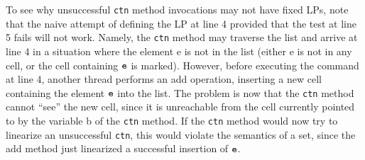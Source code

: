 To see why unsuccessful {\tt ctn} method invocations may not have fixed LPs, note
that the naive attempt of defining the LP at line 4 provided that the test at line 5 fails
will not work. Namely, the {\tt ctn} method may traverse the list and arrive at line 4 in a
situation where the element e is not in the list (either e is not in any cell, or the cell
containing $\tt e$ is marked). However, before executing the command at line 4, another
thread performs an add operation, inserting a new cell containing the element $\tt e$ into
the list. The problem is now that the {\tt ctn} method cannot “see” the new cell, since it is
unreachable from the cell currently pointed to by the variable b of the {\tt ctn} method. If
the {\tt ctn} method would now try to linearize an unsuccessful {\tt ctn}, this would violate
the semantics of a set, since the add method just linearized a successful insertion of $\tt e$.
%

